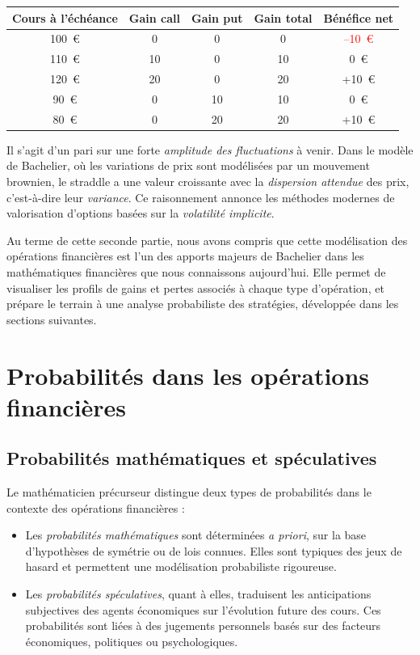 \documentclass[12pt,a4paper]{article}
\begin{document}
\begin{center}
\begin{tabular}{|c|c|c|c|c|}
\hline
\textbf{Cours à l’échéance} & \textbf{Gain call} & \textbf{Gain put} & \textbf{Gain total} & \textbf{Bénéfice net} \\
\hline
100~€ & 0 & 0 & 0 & \textcolor{red}{--10~€} \\
\hline
110~€ & 10 & 0 & 10 & 0~€ \\
\hline
120~€ & 20 & 0 & 20 & \textcolor{green!60!black}{+10~€} \\
\hline
90~€ & 0 & 10 & 10 & 0~€ \\
\hline
80~€ & 0 & 20 & 20 & \textcolor{green!60!black}{+10~€} \\
\hline
\end{tabular}
\end{center}

Il s’agit d’un pari sur une forte \textit{amplitude des fluctuations} à venir. Dans le modèle de Bachelier, où les variations de prix sont modélisées par un mouvement brownien, le straddle a une valeur croissante avec la \textit{dispersion attendue} des prix, c’est-à-dire leur \textit{variance}. Ce raisonnement annonce les méthodes modernes de valorisation d’options basées sur la \textit{volatilité implicite}.


\bigskip

\noindent
Au terme de cette seconde partie, nous avons compris que cette modélisation des opérations financières est l’un des apports majeurs de Bachelier dans les mathématiques financières que nous connaissons aujourd'hui. Elle permet de visualiser les profils de gains et pertes associés à chaque type d’opération, et prépare le terrain à une analyse probabiliste des stratégies, développée dans les sections suivantes.

\section{Probabilités dans les opérations financières}

\subsection{Probabilités mathématiques et spéculatives}

Le mathématicien précurseur distingue deux types de probabilités dans le contexte des opérations financières :

\begin{itemize}
    \item Les \textit{probabilités mathématiques} sont déterminées \textit{a priori}, sur la base d’hypothèses de symétrie ou de lois connues. Elles sont typiques des jeux de hasard et permettent une modélisation probabiliste rigoureuse.

    \item Les \textit{probabilités spéculatives}, quant à elles, traduisent les anticipations subjectives des agents économiques sur l’évolution future des cours. Ces probabilités sont liées à des jugements personnels basés sur des facteurs économiques, politiques ou psychologiques.
\end{itemize}
\end{document}
